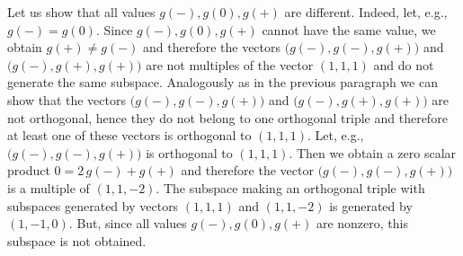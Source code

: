 \documentclass{article}
\begin{document}
Let us show that all values $g(-), g(0), g(+)$ are different. Indeed, let,
e.g., $g(-) = g(0)$. Since $g(-), g(0), g(+)$ cannot have the same value, we
obtain $g(+) \neq g(-)$ and therefore the vectors $\bigl( g(-), g(-), g(+)
\bigr)$ and $\bigl( g(-), g(+), g(+) \bigr)$ are not multiples of the vector
$(1,1,1)$ and do not generate the same subspace. Analogously as in the
previous paragraph we can show that the vectors $\bigl( g(-), g(-), g(+)
\bigr)$ and $\bigl( g(-), g(+), g(+) \bigr)$ are not orthogonal, hence they
do not belong to one orthogonal triple and therefore at least one of
these vectors is orthogonal to $(1,1,1)$. Let, e.g., $\bigl( g(-), g(-),
g(+) \bigr)$ is orthogonal to $(1,1,1)$. Then we obtain a zero scalar
product $0 = 2\,g(-) + g(+)$ and therefore the vector $\bigl( g(-), g(-),
g(+) \bigr)$ is a multiple of $(1,1,-2)$. The subspace making an orthogonal
triple with subspaces generated by vectors $(1,1,1)$ and $(1,1,-2)$ is
generated by $(1,-1,0)$. But, since all values $g(-), g(0), g(+)$ are
nonzero, this subspace is not obtained.
\end{document}

